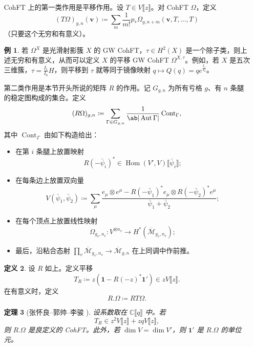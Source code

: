 \documentclass{amsart}
\newtheorem{thm}{定理}[section]
\theoremstyle{definition}
\newtheorem{defn}[thm]{定义}
\newtheorem{exm}[thm]{例}
\theoremstyle{remark}
\theoremstyle{plain}
\theoremstyle{definition}
\theoremstyle{remark}
\newcommand{\C}{\mathbb{C}}
\newcommand{\Mbar}{\overline{\mathcal{M}}}
\newcommand{\mbf}[1]{\mathbf{#1}}
\newcommand{\bv}{\mbf{v}}
\newcommand{\on}[1]{\operatorname{#1}}
\newcommand{\1}{\mathbf{1}}
\newcommand{\2}{\mathbf{2}}
\newcommand{\3}{\mathbf{3}}
\newcommand{\ps}[1]{\llbracket #1 \rrbracket}
\DeclareMathOperator{\Hom}{Hom}
\DeclareMathOperator{\Aut}{Aut}
\begin{document}
CohFT 上的第一类作用是平移作用。设 $T \in V\ps{z}$。对 CohFT $\Omega$，定义
\[ (T\Omega)_{g,n}(\bv) \coloneqq \sum_m \frac{1}{m!} p_* \Omega_{g,n+m}(\bv, T,\ldots,T) \]
（只要这个无穷和有意义）。

\begin{exm}
    若 $\Omega^X$ 是光滑射影簇 $X$ 的 GW CohFT，$\tau \in H^2(X)$ 是一个除子类，则上述无穷和有意义，从而可以定义 $X$ 的平移 GW CohFT $\Omega^{X,\tau}$。例如，若 $X$ 是五次三维簇，$\tau = \frac{I_1}{I_0} H$，则平移到 $\tau$ 就等同于镜像映射 $q \mapsto Q(q) = q e^{\frac{I_1}{I_0}}$。
\end{exm}

第二类作用是本节开头所说的矩阵 $R$ 的作用。记 $G_{g,n}$ 为所有亏格 $g$、有 $n$ 条腿的稳定图构成的集合。定义
\[ (R\Omega)_{g,n} \coloneqq \sum_{\Gamma \in G_{g,n}} \frac{1}{\ab|\Aut \Gamma|} \on{Cont}_{\Gamma}, \]
其中 $\on{Cont}_{\Gamma}$ 由如下构造给出：
\begin{itemize}
    \item 在第 $i$ 条腿上放置映射
        \[ R(-\bar{\psi}_i)^* \in \Hom(V',V) \ps{\bar{\psi}_i}; \]
    \item 在每条边上放置双向量
        \[ V(\bar{\psi}_1, \bar{\psi}_2) \coloneqq \sum_{\mu} \frac{e_{\mu} \otimes e^{\mu} - R(-\bar{\psi}_1)^* e_{\mu} \otimes R(-\bar{\psi}_2)^* e^{\mu}}{\bar{\psi}_1 + \bar{\psi}_2}; \]
    \item 在每个顶点上放置线性映射
        \[ \Omega_{g_v, n_v} \colon V^{\otimes n_v} \to H^*(\Mbar_{g_v, n_v}); \]
    \item 最后，沿粘合态射 $\prod_v \Mbar_{g_v, n_v} \to \Mbar_{g,n}$ 在上同调中作前推。
\end{itemize}

\begin{defn}
    设 $R$ 如上。定义平移
    \[ T_R \coloneqq z (\1 - R(-z)^* \1') \in z V\ps{z}. \]
    在有意义时，定义
    \[ R.\Omega \coloneqq RT\Omega. \]
\end{defn}

\begin{thm}[张怀良--郭帅--李骏 {\cite[定理~2.7]{CGL2026}}]
    设系数取在 $\C\ps{q}$ 中。若
    \[ T_R \in z^2 V \ps{z} + zq V \ps{z}, \]
    则 $R.\Omega$ 是良定义的 CohFT。此外，若 $\dim V = \dim V'$，则 $\1'$ 是 $R.\Omega$ 的单位元。
\end{thm}
\end{document}
